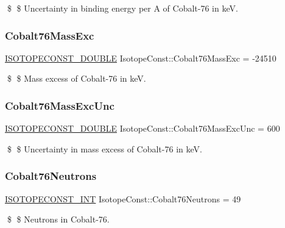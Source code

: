 \$ \$ Uncertainty in binding energy per A of Cobalt-\/76 in keV. \mbox{\label{group___isotope_const-_cobalt-_co76_ga64e10c16cad236af1bd5ac7d6ac134e3}} 
\subsubsection{\texorpdfstring{Cobalt76\+Mass\+Exc}{Cobalt76MassExc}}
{\footnotesize\ttfamily \mbox{\hyperlink{group___isotope_const-_macros_ga8f45a7272ce02c0b4c65c44636ed719a}{I\+S\+O\+T\+O\+P\+E\+C\+O\+N\+S\+T\+\_\+\+D\+O\+U\+B\+LE}} Isotope\+Const\+::\+Cobalt76\+Mass\+Exc = -\/24510}

\$ \$ Mass excess of Cobalt-\/76 in keV. \mbox{\label{group___isotope_const-_cobalt-_co76_ga3130ff61089f64f1c384b0f120d348ad}} 
\subsubsection{\texorpdfstring{Cobalt76\+Mass\+Exc\+Unc}{Cobalt76MassExcUnc}}
{\footnotesize\ttfamily \mbox{\hyperlink{group___isotope_const-_macros_ga8f45a7272ce02c0b4c65c44636ed719a}{I\+S\+O\+T\+O\+P\+E\+C\+O\+N\+S\+T\+\_\+\+D\+O\+U\+B\+LE}} Isotope\+Const\+::\+Cobalt76\+Mass\+Exc\+Unc = 600}

\$ \$ Uncertainty in mass excess of Cobalt-\/76 in keV. \mbox{\label{group___isotope_const-_cobalt-_co76_ga6763d307b8de0126b57b1d736e6b5723}} 
\subsubsection{\texorpdfstring{Cobalt76\+Neutrons}{Cobalt76Neutrons}}
{\footnotesize\ttfamily \mbox{\hyperlink{group___isotope_const-_macros_ga5f18360b3e99483a35c32d789e62621c}{I\+S\+O\+T\+O\+P\+E\+C\+O\+N\+S\+T\+\_\+\+I\+NT}} Isotope\+Const\+::\+Cobalt76\+Neutrons = 49}

\$ \$ Neutrons in Cobalt-\/76. \mbox{\label{group___isotope_const-_cobalt-_co76_ga0b932cb2388c97d09d9a47f04c145f3a}} 
